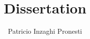 \documentclass[11pt]{report}
\theoremstyle{plain}
\theoremstyle{definition}
\begin{document}
\title{Dissertation}
\author{Patricio Inzaghi Pronesti}
\maketitle

\begin{abstract}
    
\end{abstract}

\tableofcontents















\printbibliography
\end{document}
